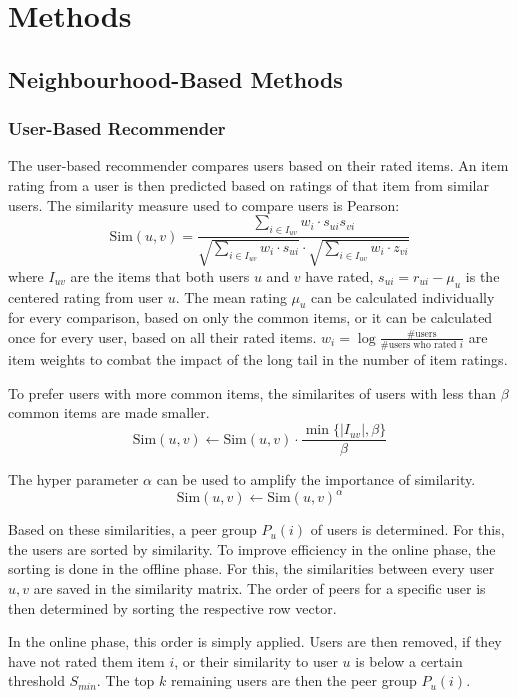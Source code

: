 \documentclass[sigconf]{acmart}
\newcommand{\set}[1]{\{#1\}}
\newcommand{\abs}[1]{\left\vert #1 \right\vert}
\begin{document}
\section{Methods}
\subsection{Neighbourhood-Based Methods}
\label{sec:methods:neighbourhood}

\subsubsection{User-Based Recommender}
\label{sec:methods:neighbourhood:user}
The user-based recommender compares users based on their rated items. An item rating from a user is then predicted based on ratings of that item from similar users.
The similarity measure used to compare users is Pearson:
$$\text{Sim}(u, v) = \frac{\sum\limits_{i\in I_{uv}} w_i \cdot s_{ui} s_{vi}}{\sqrt{\sum\limits_{i\in I_{uv}} w_i \cdot  s_{ui}} \cdot \sqrt{\sum\limits_{i\in I_{uv}} w_i \cdot  z_{vi}}}$$
where $I_{uv}$ are the items that both users $u$ and $v$ have rated, $s_{ui} = r_{ui} - \mu_u$ is the centered rating from user $u$.
The mean rating $\mu_u$ can be calculated individually for every comparison, based on only the common items, or it can be calculated once for every user, based on all their rated items.
$w_i = \log\frac{\text{\# users}}{\text{\# users who rated } i}$ are item weights to combat the impact of the long tail in the number of item ratings.

To prefer users with more common items, the similarites of users with less than $\beta$ common items are made smaller.
$$\text{Sim}(u, v) \gets \text{Sim}(u, v) \cdot \frac{\min\set{\abs{I_{uv}}, \beta}}{\beta}$$

The hyper parameter $\alpha$ can be used to amplify the importance of similarity.
$$\text{Sim}(u, v) \gets \text{Sim}(u, v)^\alpha$$

Based on these similarities, a peer group $P_u(i)$ of users is determined. For this, the users are sorted by similarity.
To improve efficiency in the online phase, the sorting is done in the offline phase.
For this, the similarities between every user $u, v$ are saved in the similarity matrix.
The order of peers for a specific user is then determined by sorting the respective row vector.

In the online phase, this order is simply applied. Users are then removed, if they have not rated them item $i$, or their similarity to user $u$ is below a certain threshold $S_{min}$.
The top $k$ remaining users are then the peer group $P_u(i)$.
\end{document}
